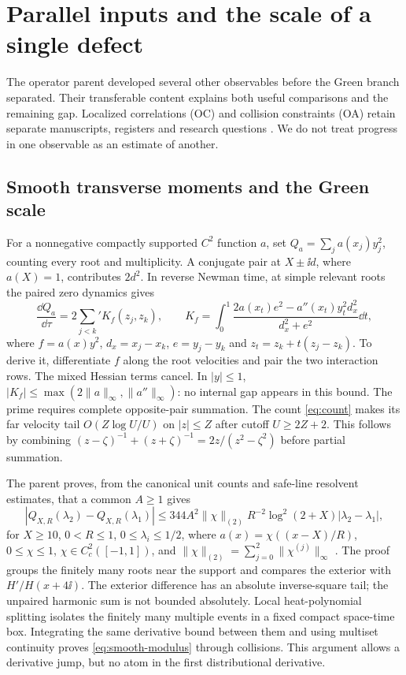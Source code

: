 \section{Parallel inputs and the scale of a single defect}
\label{sec:parallel}

The operator parent developed several other observables before the Green
branch separated. Their transferable content explains both useful
comparisons and the remaining gap. Localized correlations (OC) and
collision constraints (OA) retain separate manuscripts, registers and
research questions \cite{GNPCorrelations,GNPCollisions}. We do not treat
progress in one observable as an estimate of another.

\subsection{Smooth transverse moments and the Green scale}
For a nonnegative compactly supported \(C^2\) function \(a\), set
\(Q_a=\sum_j a(x_j)y_j^2\), counting every root and multiplicity.
A conjugate pair at \(X\pm\ii d\), where \(a(X)=1\), contributes
\(2d^2\). In reverse Newman time, at simple relevant roots the paired
zero dynamics gives
\begin{equation}\label{eq:smooth-kernel}
 \frac{\dd Q_a}{\dd\tau}=2\sum_{j<k}'K_f(z_j,z_k),\qquad
 K_f=\int_0^1\frac{2a(x_t)e^2-a''(x_t)y_t^2d_x^2}
                         {d_x^2+e^2}\dd t,
\end{equation}
where \(f=a(x)y^2\), \(d_x=x_j-x_k\), \(e=y_j-y_k\) and
\(z_t=z_k+t(z_j-z_k)\). To derive it, differentiate \(f\) along the
root velocities and pair the two interaction rows. The mixed Hessian
terms cancel. In \(|y|\le1\),
\(|K_f|\le\max(2\|a\|_\infty,\|a''\|_\infty)\): no internal gap
appears in this bound. The prime requires complete opposite-pair
summation. The count \eqref{eq:count} makes its far velocity tail
\(O(Z\log U/U)\) on \(|z|\le Z\) after cutoff \(U\ge2Z+2\).
This follows by combining \((z-\zeta)^{-1}+(z+\zeta)^{-1}
=2z/(z^2-\zeta^2)\) before partial summation.

The parent proves, from the canonical unit counts and safe-line
resolvent estimates, that a common \(A\ge1\) gives
\begin{equation}\label{eq:smooth-modulus}
 |Q_{X,R}(\lambda_2)-Q_{X,R}(\lambda_1)|
 \le344A^2\|\chi\|_{(2)}R^{-2}\log^2(2+X)|\lambda_2-\lambda_1|,
\end{equation}
for \(X\ge10\), \(0<R\le1\), \(0\le\lambda_i\le1/2\), where
\(a(x)=\chi((x-X)/R)\), \(0\le\chi\le1\),
\(\chi\in C_c^2([-1,1])\), and
\(\|\chi\|_{(2)}=\sum_{j=0}^2\|\chi^{(j)}\|_\infty\)
\cite{SmoothLocalizationProof,SmoothLocalizationAssessment}.
The proof groups the finitely many roots near the support and compares
the exterior with \(H'/H(x+4\ii)\). The exterior difference has an
absolute inverse-square tail; the unpaired harmonic sum is not bounded
absolutely. Local heat-polynomial splitting isolates the finitely many
multiple events in a fixed compact space-time box. Integrating the same
derivative bound between them and using multiset continuity proves
\eqref{eq:smooth-modulus} through collisions. This argument allows a
derivative jump, but no atom in the first distributional derivative.

